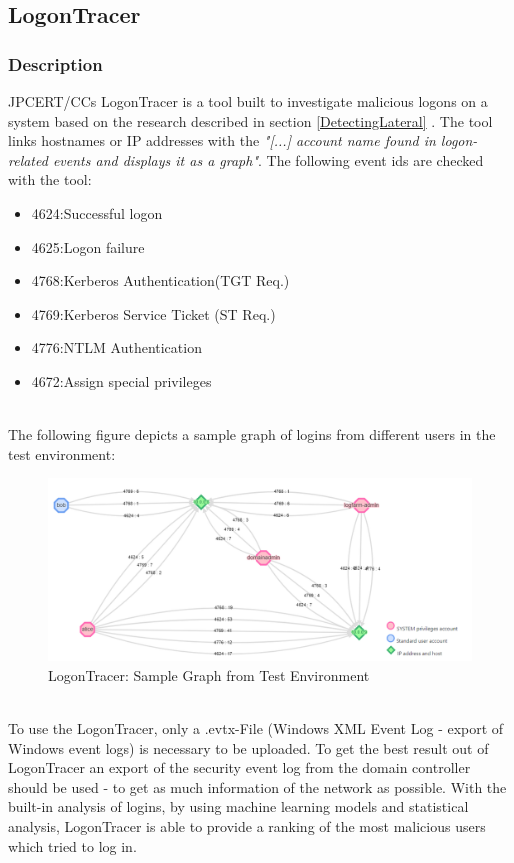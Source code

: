 \subsection{LogonTracer}
\subsubsection{Description}
JPCERT/CCs LogonTracer is a tool built to investigate malicious logons on a system based on the research described in section \ref{DetectingLateral} . The tool links hostnames or IP addresses with the \textit{"[...] account name found in logon-related events and displays it as a graph"}. \cite{LogonTracer} The following event ids are checked with the tool: 
\ \\
\begin{multicols}{2}
    \begin{itemize}
        \item 4624:Successful logon
        \item 4625:Logon failure
        \item 4768:Kerberos Authentication(TGT Req.)
        \item 4769:Kerberos Service Ticket (ST Req.)
        \item 4776:NTLM Authentication
        \item 4672:Assign special privileges
    \end{itemize}
\end{multicols} \ \\
The following figure depicts a sample graph of logins from different users in the test environment:
\begin{figure}[H]
    \centering
    \includegraphics[width=0.8\linewidth]{assets/LogonTracer/LogonTrace_LogFarm.png}
    \caption{LogonTracer: Sample Graph from Test Environment}
    \label{fig:LogonTracerSample}
\end{figure}
\ \\
To use the LogonTracer, only a .evtx-File (Windows XML Event Log - export of Windows event logs) is necessary to be uploaded. To get the best result out of LogonTracer an export of the security event log from the domain controller should be used - to get as much information of the network as possible. With the built-in analysis of logins, by using machine learning models and statistical analysis, LogonTracer is able to provide a ranking of the most malicious users which tried to log in. \cite{LogonTracerBlog}
